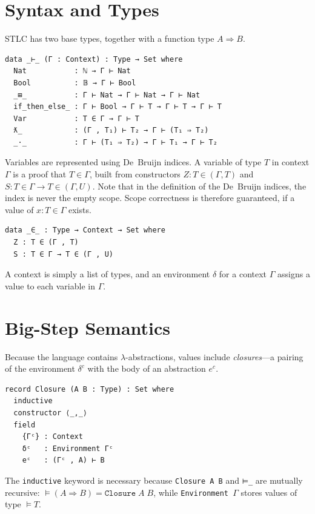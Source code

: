 \section{Syntax and Types}

STLC has two base types, together with a function type $A \Rightarrow B$.

\begin{verbatim}
data _⊢_ (Γ : Context) : Type → Set where
  Nat           : ℕ → Γ ⊢ Nat
  Bool          : 𝔹 → Γ ⊢ Bool
  _⊞_           : Γ ⊢ Nat → Γ ⊢ Nat → Γ ⊢ Nat
  if_then_else_ : Γ ⊢ Bool → Γ ⊢ T → Γ ⊢ T → Γ ⊢ T
  Var           : T ∈ Γ → Γ ⊢ T
  ƛ_            : (Γ , T₁) ⊢ T₂ → Γ ⊢ (T₁ ⇒ T₂)
  _·_           : Γ ⊢ (T₁ ⇒ T₂) → Γ ⊢ T₁ → Γ ⊢ T₂
\end{verbatim}

Variables are represented using De~Bruijn indices.
A variable of type $T$ in context $\Gamma$ is a proof that $T \in \Gamma$, built from
constructors $Z : T \in (\Gamma , T)$ and $S : T \in \Gamma \to T \in (\Gamma , U)$.
Note that in the definition of the De~Bruijn indices, the index is never the empty scope.
Scope correctness is therefore guaranteed, if a value of $x : T \in \Gamma$ exists.

\begin{verbatim}
data _∈_ : Type → Context → Set where
  Z : T ∈ (Γ , T)
  S : T ∈ Γ → T ∈ (Γ , U)
\end{verbatim}


A context is simply a list of types, and an environment $\delta$ for a context $\Gamma$ assigns a value to each variable in $\Gamma$.

\section{Big-Step Semantics}
\label{sec:stlc-big-steps}

Because the language contains $\lambda$-abstractions, values include
\emph{closures}---a pairing of the environment $\delta^c$ with the body of an
abstraction $e^c$.

\begin{verbatim}
record Closure (A B : Type) : Set where
  inductive
  constructor ⟨_,_⟩
  field
    {Γᶜ} : Context
    δᶜ   : Environment Γᶜ
    eᶜ   : (Γᶜ , A) ⊢ B
\end{verbatim}

The \texttt{inductive} keyword is necessary because \texttt{Closure A B} and \texttt{⊨\_} are mutually recursive: $\vDash (A \Rightarrow B) = \mathtt{Closure}\;A\;B$, while \texttt{Environment~$\Gamma$} stores values of type $\vDash T$.


